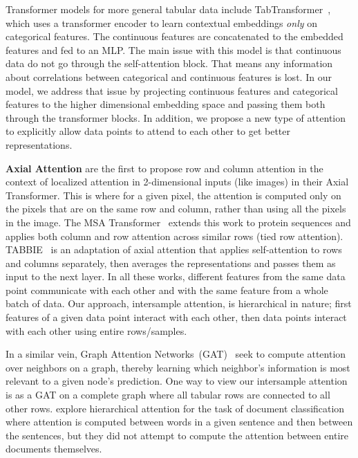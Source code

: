 \documentclass{article}
\newcommand{\gowthami}[1]{\textcolor{red}{#1}}
\newcommand{\bayan}[1]{\textcolor{cyan}{#1}}
\begin{document}
Transformer models for more general tabular data include
TabTransformer~\cite{huang2020tabtransformer}, which uses a transformer encoder to learn contextual embeddings \emph{only} on categorical features. The continuous features are concatenated to the embedded features and fed to an MLP. The main issue with this model is that continuous data do not go through the self-attention block. That means any information about correlations between categorical and continuous features is lost. In our model, we address that issue by projecting continuous features and categorical features to the higher dimensional embedding space and passing them both through the transformer blocks. In addition, we propose a new type of attention to explicitly allow data points to attend to each other to get better representations.

\textbf{Axial Attention} \citet{ho2019axial} are the first to propose row and column attention in the context of localized attention in 2-dimensional inputs (like images) in their Axial Transformer. This is where for a given pixel, the attention is computed only on the pixels that are on the same row and column, rather than using all the pixels in the image. The MSA Transformer~\cite{rao2021msa} extends this work to protein sequences and applies both column and row attention across similar rows (tied row attention). TABBIE~\cite{iida2021tabbie} is an adaptation of axial attention that applies self-attention to rows and columns separately, then averages the representations and passes them as input to the next layer. In all these works, different features from the same data point communicate with each other and with the same feature from a whole batch of data. Our approach, intersample attention, is hierarchical in nature; first features of a given data point interact with each other, then data points interact with each other using entire rows/samples. 

In a similar vein, Graph Attention Networks~(GAT)~\cite{velivckovic2017graph} seek to compute attention over neighbors on a graph, thereby learning which neighbor's information is most relevant to a given node’s prediction. One way to view our intersample attention is as a GAT on a complete graph where all tabular rows are connected to all other rows. \citet{yang2016hierarchical} explore hierarchical attention for the task of document classification where attention is computed between words in a given sentence and then between the sentences, but they did not attempt to compute the attention between entire documents themselves.
\end{document}

